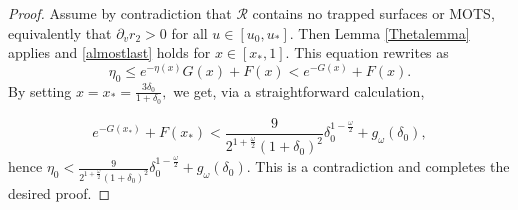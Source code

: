 \documentclass{article}[11pt]
\newcommand{\be}{\begin{equation}}
\newcommand{\ee}{\end{equation}}
\numberwithin{equation}{section}
\begin{document}
\begin{proof}
Assume by contradiction that $\mathcal{R}$ contains no trapped surfaces or MOTS, equivalently that $\partial_v r_2 >0$ for all $u \in [u_0,u_{*}]$. Then Lemma \ref{Thetalemma} applies and \eqref{almostlast} holds for $x \in [x_*,1]$. This equation rewrites as 
 \be \eta_0 \leq e^{-\eta(x)}G(x)+F(x) < e^{-G(x)}+F(x).\ee
By setting $x=x_*= \frac{3 \delta_0}{1+\delta_0},$ we get, via a straightforward calculation, 

\be e^{-G(x_*)}+F(x_*) < \frac{9}{2^{1+\frac{\omega}{2}}(1+\delta_0)^2} \delta_0^{1-\frac{\omega}{2}} +g_{\omega}(\delta_0), \ee
hence $\eta_0 <\frac{9}{2^{1+\frac{\omega}{2}}(1+\delta_0)^2} \delta_0^{1-\frac{\omega}{2}} +g_{\omega}(\delta_0)$. This is a contradiction and completes the desired proof.
\end{proof}
\end{document}

